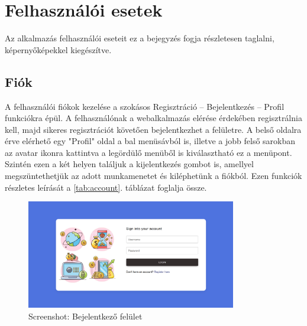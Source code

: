 \section{Felhasználói esetek}
Az alkalmazás felhasználói eseteit ez a bejegyzés fogja részletesen taglalni, képernyőképekkel kiegészítve.

\subsection{Fiók}
A felhasználói fiókok kezelése a szokásos Regisztráció – Bejelentkezés – Profil funkciókra épül. A felhasználónak a webalkalmazás elérése érdekében regisztrálnia kell, majd sikeres regisztrációt követően bejelentkezhet a felületre. A belső oldalra érve elérhető egy "Profil" oldal a bal menüsávból is, illetve a jobb felső sarokban az avatar ikonra kattintva a legördülő menüből is kiválasztható ez a menüpont. Szintén ezen a két helyen találjuk a kijelentkezés gombot is, amellyel megszüntethetjük az adott munkamenetet és kiléphetünk a fiókból. Ezen funkciók részletes leírását a \ref{tab:account}. táblázat foglalja össze.
\begin{figure}[H]
	\centering
	\includegraphics[height=180px]{img/login}
	\caption{Screenshot: Bejelentkező felület}
	\label{fig:login}
\end{figure}


